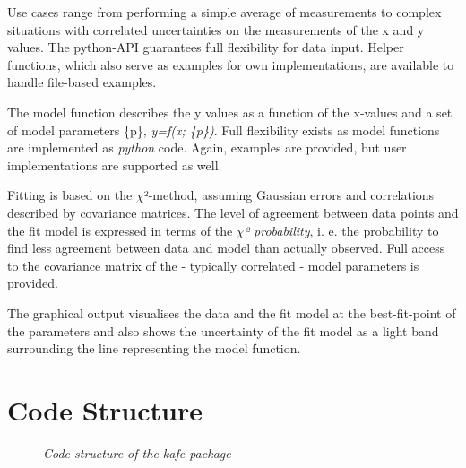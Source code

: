 \documentclass[a4paper,10pt,english]{sphinxmanual}
\begin{document}
Use cases range from performing a simple average of measurements
to complex situations with correlated uncertainties on the measurements
of the x and y values. The python-API guarantees full flexibility
for data input. Helper functions, which also serve as examples for
own implementations,  are available to handle file-based examples.

The model function describes the y values as a function of the
x-values and a set of model parameters \{p\}, \emph{y=f(x; \{p\})}. Full
flexibility exists as model functions are implemented as
\emph{python} code. Again, examples are provided, but user
implementations are supported as well.

Fitting is based on the \(\chi\)²-method, assuming Gaussian errors and
correlations described by covariance matrices. The level of agreement
between data points and the fit model is expressed in terms of the
\emph{\(\chi\)² probability}, i. e. the probability to find less agreement between
data and model than actually observed. Full access to the covariance
matrix of the - typically correlated - model parameters is provided.

The graphical output visualises the data and the fit model at the
best-fit-point of the parameters and also shows the uncertainty
of the fit model as a light band surrounding the line representing
the model function.


\section{Code Structure}
\label{index:code-structure}\begin{figure}[htbp]\begin{flushright}
\capstart

\caption{\emph{Code structure of the kafe package}}\end{flushright}\end{figure}
\end{document}

